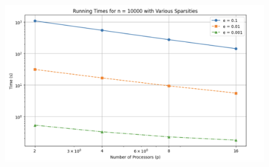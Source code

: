 \documentclass{article}
\begin{document}
\begin{figure}[H]
    \centering
    \includegraphics[width=1\linewidth]{Screenshot 2024-04-21 at 21.35.08.png}
\end{figure}
\end{document}
